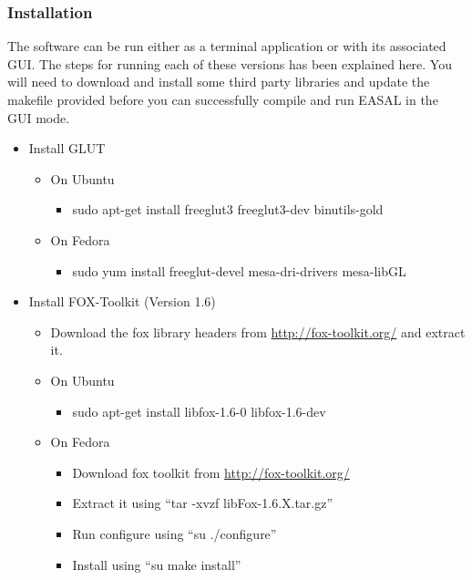 \documentclass[10pt]{article}
\begin{document}
\subsubsection{Installation}
The software can be run either as a terminal application or with its associated GUI.
The steps for running each of these versions has been explained here. You will need to download and install some third party libraries and update the makefile provided before you can successfully compile and run EASAL in the GUI mode.  
\begin{itemize}
	\item Install GLUT 
	  \begin{itemize}
	  \item On Ubuntu 
	  	  \begin{itemize}
	  	  	\item sudo apt-get install freeglut3 freeglut3-dev binutils-gold
		  \end{itemize}
	 \item On Fedora
	 \begin{itemize}
	  	  \item sudo yum install freeglut-devel mesa-dri-drivers mesa-libGL 
\end{itemize}
	  \end{itemize}
     \item Install FOX-Toolkit (Version 1.6)
	   \begin{itemize}
		   \item Download the fox library headers from \url{http://fox-toolkit.org/} and extract it.
		   \item On Ubuntu
		   \begin{itemize}
	   	   		\item sudo apt-get install libfox-1.6-0 libfox-1.6-dev
			\end{itemize}
		   \item On Fedora
		   	\begin{itemize}
		   		\item Download fox toolkit from \url{http://fox-toolkit.org/}
				\item Extract it using ``tar -xvzf libFox-1.6.X.tar.gz''
				\item Run configure using ``su ./configure''
				\item Install using ``su make install''
			\end{itemize}


\end{itemize}
\end{itemize}
\end{document}

